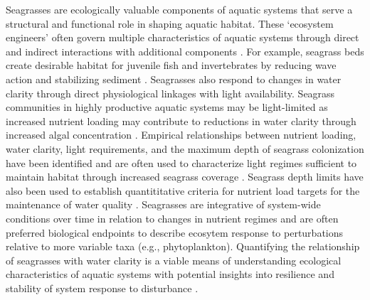 \documentclass[letterpaper,12pt,oneside]{article}\usepackage[]{graphicx}\usepackage[]{color}
\begin{document}
Seagrasses are ecologically valuable components of aquatic systems that serve a structural and functional role in shaping aquatic habitat.  These `ecosystem engineers' often govern multiple characteristics of aquatic systems through direct and indirect interactions with additional components \citep{Jones94,Koch01}.  For example, seagrass beds create desirable habitat for juvenile fish and invertebrates by reducing wave action and stabilizing sediment \citep{williams01,Hughes09}.  Seagrasses also respond to changes in water clarity through direct physiological linkages with light availability.  Seagrass communities in highly productive aquatic systems may be light-limited as increased nutrient loading may contribute to reductions in water clarity through increased algal concentration \citep{Duarte95}.  Empirical relationships between nutrient loading, water clarity, light requirements, and the maximum depth of seagrass colonization have been identified \citep{Duarte91,Kenworthy96,Choice14} and are often used to characterize light regimes sufficient to maintain habitat through increased seagrass coverage \citep{Steward05}.  Seagrass depth limits have also been used to establish quantititative criteria for nutrient load targets for the maintenance of water quality \citep{Janicki96}.  Seagrasses are integrative of system-wide conditions over time in relation to changes in nutrient regimes \citep{Duarte95} and are often preferred biological endpoints to describe ecosytem response to perturbations relative to more variable taxa (e.g., phytoplankton).  Quantifying the relationship of seagrasses with water clarity is a viable means of understanding ecological characteristics of aquatic systems with potential insights into resilience and stability of system response to disturbance \citep{Greve05}.    
\end{document}
